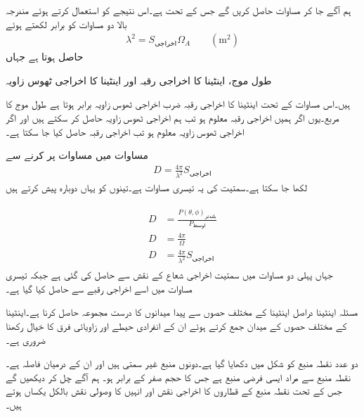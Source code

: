 ہم آگے جا کر مساوات  حاصل کریں گے جس کے تحت   ہے۔اس نتیجے کو استعمال کرتے ہوئے مندرجہ بالا دو مساوات کو برابر لکھتے ہوئے
\begin{align}\label{مساوات_اینٹینا_اخراجی_ٹھوس_زاویہ_اخراجی_رقبہ_تعلق}
\lambda^2 =S_{\text{اخراجی}} \Omega_A \quad \quad (\si{\meter \squared})
\end{align}
حاصل ہوتا ہے جہاں
\begin{description}
 طول موج،
  اینٹینا کا اخراجی رقبہ اور
 اینٹینا کا اخراجی ٹھوس زاویہ
\end{description}
ہیں۔اس مساوات کے تحت اینٹینا کا اخراجی رقبہ ضرب اخراجی ٹھوس زاویہ برابر ہوتا ہے  طول موج کا مربع۔یوں اگر ہمیں اخراجی رقبہ معلوم ہو تب ہم اخراجی ٹھوس زاویہ حاصل کر سکتے ہیں اور اگر اخراجی ٹھوس زاویہ معلوم ہو تب اخراجی رقبہ حاصل کیا جا سکتا ہے۔

مساوات  میں مساوات  پر کرنے سے
\begin{align}
D=\frac{4\pi}{\lambda^2} S_{\text{اخراجی}}
\end{align}
لکھا جا سکتا ہے۔سمتیت کی یہ تیسری مساوات ہے۔تینوں کو یہاں دوبارہ پیش کرتے ہیں

\begin{gather}
\begin{aligned}\label{مساوات_اینٹینا_سمتیت_مختلف_تعرف}
D&=\frac{P(\theta,\phi)_{\text{بلندتر}}}{P_{\text{اوسط}}} \\
D&=\frac{4\pi}{\Omega} \\
D&=\frac{4\pi}{\lambda^2} S_{\text{اخراجی}}
\end{aligned}
\end{gather}
جہاں پہلی دو مساوات میں سمتیت اخراجی شعاع کے نقش سے حاصل کی گئی ہے جبکہ تیسری مساوات میں اسے اخراجی رقبے سے حاصل کیا گیا ہے۔

مسئلہ اینٹینا دراصل اینٹینا کے مختلف حصوں سے پیدا میدانوں کا درست مجموعہ حاصل کرنا ہے۔اینٹینا کے مختلف حصوں کے میدان جمع کرتے ہوئے ان کے انفرادی حیطے اور زاویائی فرق کا خیال رکھنا ضروری ہے۔

 دو عدد نقطہ منبع کو شکل میں دکھایا گیا ہے۔دونوں منبع غیر سمتی ہیں اور ان کے درمیان فاصلہ  ہے۔نقطہ منبع سے مراد ایسی فرضی منبع ہے جس کا حجم صفر کے برابر ہو۔ ہم آگے چل کر  دیکھیں گے جس کے تحت نقطہ منبع کے قطاروں کا اخراجی نقش اور انہیں کا وصولی نقش بالکل یکساں ہوتے ہیں۔    

